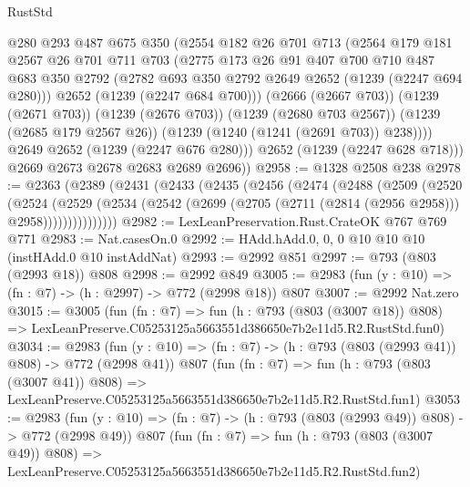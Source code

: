 \begin{lexlean}{RustStd}
\begin{coremodule}
            @280
            @293
            @487
            @675
            @350
            (@2554
              @182
              @26
              @701
              @713
              (@2564
                @179
                @181
                @2567
                @26
                @701
                @711
                @703
                (@2775
                  @173
                  @26
                  @91
                  @407
                  @700
                  @710
                  @487
                  @683
                  @350
                  @2792
                  (@2782 @693 @350 @2792 @2649 @2652 (@1239 (@2247 @694 @280)))
                  @2652
                  (@1239 (@2247 @684 @700)))
                (@2666 (@2667 @703))
                (@1239 (@2671 @703))
                (@1239 (@2676 @703))
                (@1239 (@2680 @703 @2567))
                (@1239 (@2685 @179 @2567 @26))
                (@1239 (@1240 (@1241 (@2691 @703)) @238))))
            @2649
            @2652
            (@1239 (@2247 @676 @280)))
          @2652
          (@1239 (@2247 @628 @718)))
        @2669
        @2673
        @2678
        @2683
        @2689
        @2696))
@2958 := @1328 @2508 @238
@2978 := @2363
    (@2389
      (@2431
        (@2433
          (@2435
            (@2456
              (@2474
                (@2488
                  (@2509
                    (@2520
                      (@2524
                        (@2529
                          (@2534
                            (@2542 (@2699 (@2705 (@2711 (@2814 (@2956 @2958))) @2958)))))))))))))))
@2982 := LexLeanPreservation.Rust.CrateOK @767 @769 @771
@2983 := Nat.casesOn.{0}
@2992 := HAdd.hAdd.{0, 0, 0} @10 @10 @10 (instHAdd.{0} @10 instAddNat)
@2993 := @2992 @851
@2997 := @793 (@803 (@2993 @18)) @808
@2998 := @2992 @849
@3005 := @2983 (fun (y : @10) => (fn : @7) -> (h : @2997) -> @772 (@2998 @18)) @807
@3007 := @2992 Nat.zero
@3015 := @3005
    (fun (fn : @7) =>
    fun (h : @793 (@803 (@3007 @18)) @808) =>
    LexLeanPreserve.C05253125a5663551d386650e7b2e11d5.R2.RustStd.fun0)
@3034 := @2983
    (fun (y : @10) => (fn : @7) -> (h : @793 (@803 (@2993 @41)) @808) -> @772 (@2998 @41))
    @807
    (fun (fn : @7) =>
    fun (h : @793 (@803 (@3007 @41)) @808) =>
    LexLeanPreserve.C05253125a5663551d386650e7b2e11d5.R2.RustStd.fun1)
@3053 := @2983
    (fun (y : @10) => (fn : @7) -> (h : @793 (@803 (@2993 @49)) @808) -> @772 (@2998 @49))
    @807
    (fun (fn : @7) =>
    fun (h : @793 (@803 (@3007 @49)) @808) =>
    LexLeanPreserve.C05253125a5663551d386650e7b2e11d5.R2.RustStd.fun2)

\end{coremodule}
\end{lexlean}
